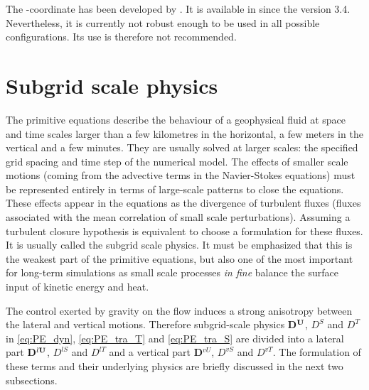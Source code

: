 \documentclass[../main/NEMO_manual]{subfiles}
\begin{document}
The \ztilde-coordinate has been developed by \citet{Leclair_Madec_OM11}.
It is available in \NEMO since the version 3.4.
Nevertheless, it is currently not robust enough to be used in all possible configurations.
Its use is therefore not recommended.


\newpage 

\section{Subgrid scale physics}
\label{sec:PE_zdf_ldf}

The primitive equations describe the behaviour of a geophysical fluid at space and time scales larger than
a few kilometres in the horizontal, a few meters in the vertical and a few minutes.
They are usually solved at larger scales: the specified grid spacing and time step of the numerical model.
The effects of smaller scale motions (coming from the advective terms in the Navier-Stokes equations) must be represented entirely in terms of large-scale patterns to close the equations.
These effects appear in the equations as the divergence of turbulent fluxes
(\ie fluxes associated with the mean correlation of small scale perturbations).
Assuming a turbulent closure hypothesis is equivalent to choose a formulation for these fluxes.
It is usually called the subgrid scale physics.
It must be emphasized that this is the weakest part of the primitive equations,
but also one of the most important for long-term simulations as
small scale processes \textit{in fine} balance the surface input of kinetic energy and heat.

The control exerted by gravity on the flow induces a strong anisotropy between the lateral and vertical motions.
Therefore subgrid-scale physics \textbf{D}$^{\mathbf{U}}$, $D^{S}$ and $D^{T}$  in
\autoref{eq:PE_dyn}, \autoref{eq:PE_tra_T} and \autoref{eq:PE_tra_S} are divided into
a lateral part  \textbf{D}$^{l \mathbf{U}}$, $D^{lS}$ and $D^{lT}$ and
a vertical part  \textbf{D}$^{vU}$, $D^{vS}$ and $D^{vT}$.
The formulation of these terms and their underlying physics are briefly discussed in the next two subsections.

\end{document}
